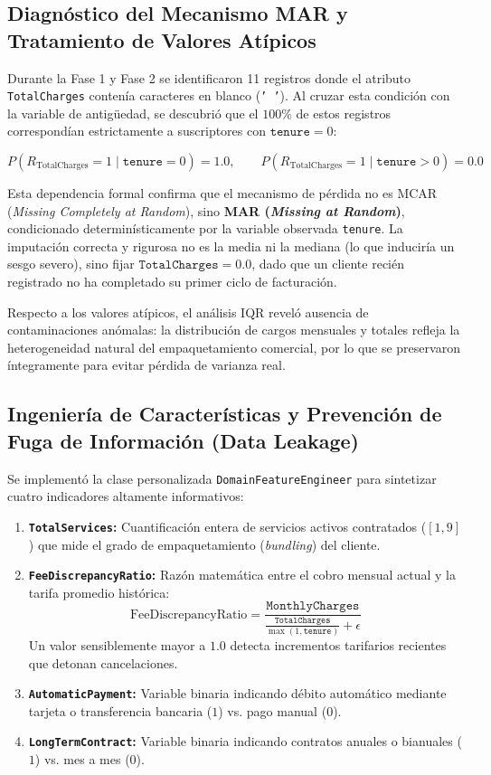 \documentclass[11pt,letterpaper]{article}
\begin{document}
\subsection{Diagnóstico del Mecanismo MAR y Tratamiento de Valores Atípicos}
Durante la Fase 1 y Fase 2 se identificaron 11 registros donde el atributo \texttt{TotalCharges} contenía caracteres en blanco (\texttt{' '}). Al cruzar esta condición con la variable de antigüedad, se descubrió que el $100\%$ de estos registros correspondían estrictamente a suscriptores con $\texttt{tenure} = 0$:

\begin{equation}
    P(R_{\text{TotalCharges}} = 1 \mid \texttt{tenure} = 0) = 1.0, \qquad P(R_{\text{TotalCharges}} = 1 \mid \texttt{tenure} > 0) = 0.0
\end{equation}

Esta dependencia formal confirma que el mecanismo de pérdida no es MCAR (\textit{Missing Completely at Random}), sino \textbf{MAR (\textit{Missing at Random})}, condicionado determinísticamente por la variable observada \texttt{tenure}. La imputación correcta y rigurosa no es la media ni la mediana (lo que induciría un sesgo severo), sino fijar $\texttt{TotalCharges} = 0.0$, dado que un cliente recién registrado no ha completado su primer ciclo de facturación.

Respecto a los valores atípicos, el análisis IQR reveló ausencia de contaminaciones anómalas: la distribución de cargos mensuales y totales refleja la heterogeneidad natural del empaquetamiento comercial, por lo que se preservaron íntegramente para evitar pérdida de varianza real.

\subsection{Ingeniería de Características y Prevención de Fuga de Información (Data Leakage)}
Se implementó la clase personalizada \texttt{DomainFeatureEngineer} para sintetizar cuatro indicadores altamente informativos:
\begin{enumerate}
    \item \textbf{\texttt{TotalServices}:} Cuantificación entera de servicios activos contratados ($[1, 9]$) que mide el grado de empaquetamiento (\textit{bundling}) del cliente.
    \item \textbf{\texttt{FeeDiscrepancyRatio}:} Razón matemática entre el cobro mensual actual y la tarifa promedio histórica:
    \begin{equation}
        \text{FeeDiscrepancyRatio} = \frac{\texttt{MonthlyCharges}}{\frac{\texttt{TotalCharges}}{\max(1, \texttt{tenure})} + \epsilon}
    \end{equation}
    Un valor sensiblemente mayor a $1.0$ detecta incrementos tarifarios recientes que detonan cancelaciones.
    \item \textbf{\texttt{AutomaticPayment}:} Variable binaria indicando débito automático mediante tarjeta o transferencia bancaria ($1$) vs. pago manual ($0$).
    \item \textbf{\texttt{LongTermContract}:} Variable binaria indicando contratos anuales o bianuales ($1$) vs. mes a mes ($0$).
\end{enumerate}
\end{document}

